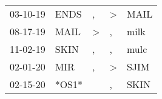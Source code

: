 \begin{supertabular}{p{0.07\textwidth}p{0.06\textwidth}p{0.02\textwidth}p{0.02\textwidth}p{0.06\textwidth}}
          03-10-19\textsuperscript{} &           ENDS\textsuperscript{} &                , &     \textgreater &           MAIL\textsuperscript{} \\
          08-17-19\textsuperscript{} &           MAIL\textsuperscript{} &     \textgreater &                , &           milk\textsuperscript{} \\
          11-02-19\textsuperscript{} &           SKIN\textsuperscript{} &                , &                , &           mulc\textsuperscript{} \\
          02-01-20\textsuperscript{} &            MIR\textsuperscript{} &                , &     \textgreater &           SJIM\textsuperscript{} \\
          02-15-20\textsuperscript{} &                            *OS1* &                  &                , &           SKIN\textsuperscript{} \\
\end{supertabular}
